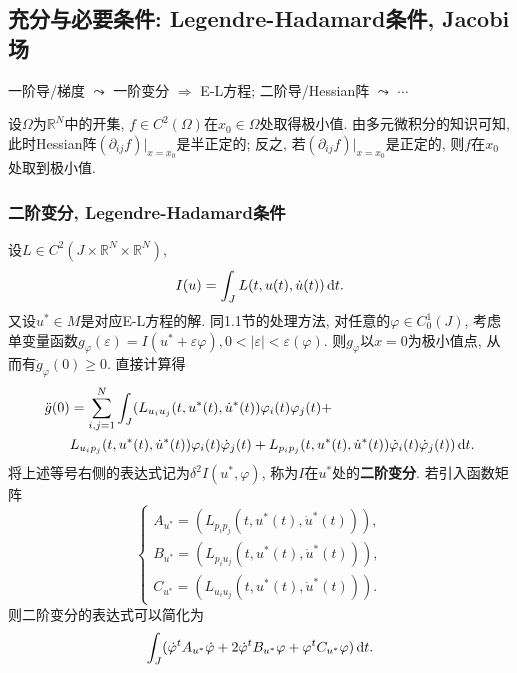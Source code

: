 \subsection{充分与必要条件: Legendre-Hadamard条件, Jacobi场}

一阶导/梯度 $\leadsto$ 一阶变分 $\Rightarrow$ E-L方程;
二阶导/Hessian阵 $\leadsto$ $\cdots$

设$\Omega$为$\mathbb{R}^N$中的开集, $f \in C^2(\Omega)$在$x_0 \in \Omega$处取得极小值.
由多元微积分的知识可知, 此时Hessian阵$(\partial_{ij}f)|_{x = x_0}$是半正定的; 反之, 若$(\partial_{ij}f)|_{x = x_0}$是正定的, 则$f$在$x_0$处取到极小值.

\subsubsection{二阶变分, Legendre-Hadamard条件}

设$L \in C^2(J \times \mathbb{R}^N \times \mathbb{R}^N)$, 
\begin{equation*}
    I(u) = \int_JL(t, u(t), \dot{u}(t)) \,{\rm d}t.
\end{equation*}
又设$u^* \in M$是对应E-L方程的解. 同1.1节的处理方法, 对任意的$\varphi \in C_0^1(J)$, 考虑单变量函数$g_{\varphi}(\varepsilon) = I(u^* + \varepsilon\varphi), 0 < |\varepsilon| < \varepsilon(\varphi)$.
则$g_{\varphi}$以$x = 0$为极小值点, 从而有$\ddot g_{\varphi}(0) \geq 0$. 直接计算得 
\begin{align*}
    \ddot{g}(0) &= \sum\limits_{i, j = 1}^N\int_J(L_{u_iu_j}(t, u^*(t), \dot{u}^*(t))\varphi_i(t)\varphi_j(t) + \\
    &L_{u_ip_j}(t, u^*(t), \dot{u}^*(t))\varphi_i(t)\dot{\varphi}_j(t) + L_{p_ip_j}(t, u^*(t), \dot{u}^*(t))\dot{\varphi}_i(t)\dot{\varphi}_j(t)) \,{\rm d}t.
\end{align*}
将上述等号右侧的表达式记为$\delta^2I(u^*, \varphi)$, 称为$I$在$u^*$处的\textbf{二阶变分}.
若引入函数矩阵
\begin{equation*}
    \begin{cases} 
        A_{u^*} = (L_{p_ip_j}(t, u^*(t), \dot{u}^*(t))), \\  
        B_{u^*} = (L_{p_iu_j}(t, u^*(t), \dot{u}^*(t))), \\  
        C_{u^*} = (L_{u_iu_j}(t, u^*(t), \dot{u}^*(t))).   
    \end{cases}
\end{equation*}
则二阶变分的表达式可以简化为 
\begin{equation*}
    \int_J(\dot\varphi^tA_{u^*}\dot{\varphi} + 2\dot{\varphi}^tB_{u^*}\varphi + \varphi^tC_{u^*}\varphi) \,{\rm d}t.
\end{equation*}

